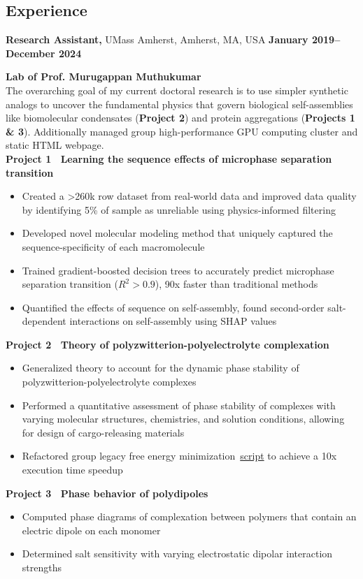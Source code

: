 \documentclass[margin,line]{res}
\begin{document}
\begin{resume}
	\section{\sc Experience}
	 {\bf Research Assistant,} UMass Amherst, Amherst, MA, USA
	\hfill {\bf January 2019--December 2024}
	\begin{adjustwidth}{1.5em}{0pt}
		{\bf Lab of Prof. Murugappan Muthukumar}\\
		The overarching goal of my current doctoral research is to use simpler
		synthetic analogs to uncover the fundamental physics that govern biological
		self-assemblies like biomolecular condensates ({\bf Project 2}) and protein
		aggregations ({\bf Projects 1 \& 3}). Additionally managed group
		high-performance GPU computing cluster and static HTML webpage.
		\\
		{\bf Project 1~\textendash{} Learning the sequence effects of microphase
		separation transition}
		\begin{itemize}
			\item Created a >260k row dataset from real-world data and improved data
			      quality by identifying 5\% of sample as unreliable using
			      physics-informed filtering
			\item Developed novel molecular modeling method that uniquely captured
			      the sequence-specificity of each macromolecule
			\item Trained gradient-boosted decision trees to accurately predict
			      microphase separation transition ($R^{2} > 0.9$), 90x faster than
			      traditional methods
			\item Quantified the effects of sequence on self-assembly, found
			      second-order salt-dependent interactions on self-assembly using SHAP
			      values
		\end{itemize}
		{\bf Project 2~\textendash{} Theory of polyzwitterion-polyelectrolyte
		complexation}
		\begin{itemize}
			\item Generalized theory to account for the dynamic phase stability of
			      polyzwitterion-polyelectrolyte complexes
			\item Performed a quantitative assessment of phase stability of complexes
			      with varying molecular structures, chemistries, and solution
			      conditions, allowing for design of cargo-releasing materials
			\item Refactored group legacy free energy
			      minimization~\href{https://github.com/samuelhoover/free-energy-minimization}{script}
			      to achieve a 10x execution time speedup
		\end{itemize}
		{\bf Project 3~\textendash{} Phase behavior of polydipoles}
		\begin{itemize}
			\item Computed phase diagrams of complexation between polymers that
			      contain an electric dipole on each monomer
			\item Determined salt sensitivity with varying electrostatic dipolar
			      interaction strengths
		\end{itemize}
	\end{adjustwidth}


\end{resume}
\end{document}
